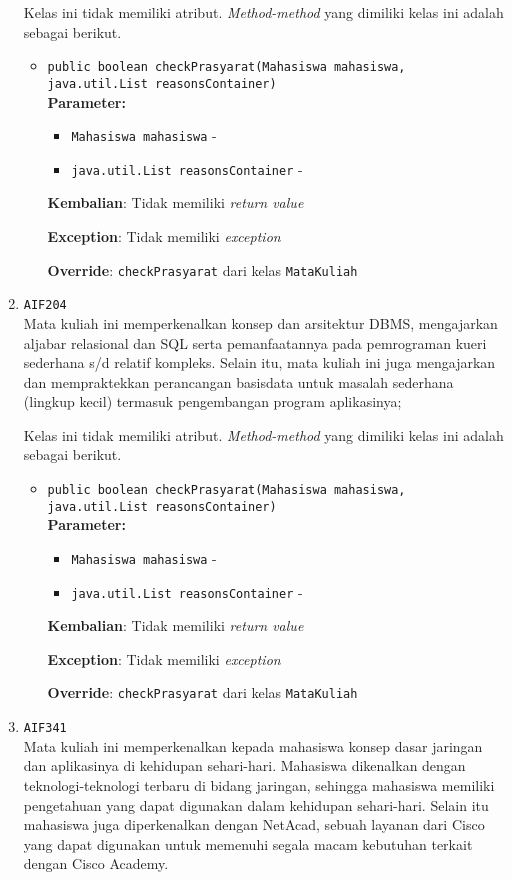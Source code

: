 \documentclass{article}
\begin{document}
\begin{enumerate}
Kelas ini tidak memiliki atribut. \textit{Method-method} yang dimiliki kelas ini adalah sebagai berikut.
\begin{itemize}
\item \texttt{public boolean checkPrasyarat(Mahasiswa mahasiswa, java.util.List reasonsContainer)}\\ 


\textbf{Parameter:}\begin{itemize}
\item \texttt{Mahasiswa mahasiswa} - 
\item \texttt{java.util.List reasonsContainer} - 
\end{itemize}
\textbf{Kembalian}: Tidak memiliki \textit{return value}

\textbf{Exception}: Tidak memiliki \textit{exception}

\textbf{Override}: \texttt{checkPrasyarat} dari kelas \texttt{MataKuliah}

\end{itemize}
\item \texttt{AIF204}\\ 
Mata kuliah ini memperkenalkan konsep dan arsitektur DBMS, mengajarkan 
 aljabar relasional dan SQL serta pemanfaatannya pada pemrograman kueri 
 sederhana s/d relatif kompleks. Selain itu, mata kuliah ini juga mengajarkan 
 dan mempraktekkan perancangan basisdata untuk masalah sederhana 
 (lingkup kecil) termasuk pengembangan program aplikasinya;

Kelas ini tidak memiliki atribut. \textit{Method-method} yang dimiliki kelas ini adalah sebagai berikut.
\begin{itemize}
\item \texttt{public boolean checkPrasyarat(Mahasiswa mahasiswa, java.util.List reasonsContainer)}\\ 


\textbf{Parameter:}\begin{itemize}
\item \texttt{Mahasiswa mahasiswa} - 
\item \texttt{java.util.List reasonsContainer} - 
\end{itemize}
\textbf{Kembalian}: Tidak memiliki \textit{return value}

\textbf{Exception}: Tidak memiliki \textit{exception}

\textbf{Override}: \texttt{checkPrasyarat} dari kelas \texttt{MataKuliah}

\end{itemize}
\item \texttt{AIF341}\\ 
Mata kuliah ini memperkenalkan kepada mahasiswa konsep dasar 
 jaringan dan aplikasinya di kehidupan sehari-hari. Mahasiswa 
 dikenalkan dengan teknologi-teknologi terbaru di bidang jaringan, 
 sehingga mahasiswa memiliki pengetahuan yang dapat digunakan 
 dalam kehidupan sehari-hari. Selain itu mahasiswa juga 
 diperkenalkan dengan NetAcad, sebuah layanan dari Cisco yang 
 dapat digunakan untuk memenuhi segala macam kebutuhan terkait 
 dengan Cisco Academy.


\end{enumerate}
\end{document}

